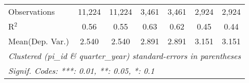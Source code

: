 \begin{tabular}{lcccccc}
   Observations                                                & 11,224        & 11,224      & 3,461          & 3,461         & 2,924        & 2,924\\  
   R$^2$                                                       & 0.56          & 0.55        & 0.63           & 0.62          & 0.45         & 0.44\\  
Mean(Dep. Var.) & 2.540 & 2.540 & 2.891 & 2.891 & 3.151 & 3.151 \\
   \midrule \midrule
   \multicolumn{7}{l}{\emph{Clustered (pi\_id \& quarter\_year) standard-errors in parentheses}}\\
   \multicolumn{7}{l}{\emph{Signif. Codes: ***: 0.01, **: 0.05, *: 0.1}}\\
\end{tabular}
\par\endgroup
